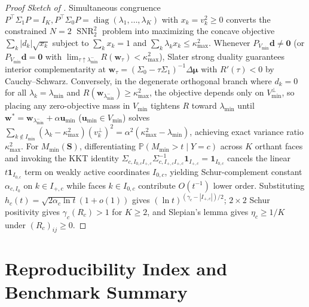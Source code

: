 \documentclass{article}
\theoremstyle{plain}
\theoremstyle{definition}
\theoremstyle{remark}
\newcommand{\Prob}{\mathbb{P}}
\newcommand{\SNR}{\operatorname{SNR}}
\begin{document}
\begin{proof}[Proof Sketch of ]
Simultaneous congruence $P^\top\Sigma_1 P = I_K, P^\top\Sigma_0 P = \operatorname{diag}(\lambda_1,\dots,\lambda_K)$ with $x_k = v_k^2 \ge 0$ converts the constrained $N=2$ $\SNR_2^2$ problem into maximizing the concave objective $\sum_k |d_k|\sqrt{x_k}$ subject to $\sum_k x_k = 1$ and $\sum_k \lambda_k x_k \le \kappa_{\max}^2$. Whenever $P_{V_{\min}}\mathbf{d} \neq \mathbf{0}$ (or $P_{V_{\min}}\mathbf{d} = \mathbf{0}$ with $\lim_{\tau \uparrow \lambda_{\min}^-} R(\mathbf{w}_\tau) < \kappa_{\max}^2$), Slater strong duality guarantees interior complementarity at $\mathbf{w}_\tau = (\Sigma_0 - \tau\Sigma_1)^{-1}\Delta\boldsymbol{\mu}$ with $R'(\tau) < 0$ by Cauchy--Schwarz. Conversely, in the degenerate orthogonal branch where $d_k = 0$ for all $\lambda_k = \lambda_{\min}$ and $R(\mathbf{w}_{\lambda_{\min}^-}) \ge \kappa_{\max}^2$, the objective depends only on $V_{\min}^\perp$, so placing any zero-objective mass in $V_{\min}$ tightens $R$ toward $\lambda_{\min}$ until $\mathbf{w}^* = \mathbf{w}_{\lambda_{\min}^-} + \alpha\mathbf{u}_{\min}$ ($\mathbf{u}_{\min} \in V_{\min}$) solves $\sum_{k \notin I_{\min}}(\lambda_k - \kappa_{\max}^2)(v_k^{\perp})^2 = \alpha^2(\kappa_{\max}^2 - \lambda_{\min})$, achieving exact variance ratio $\kappa_{\max}^2$. For $M_{\min}(\mathbf{S})$, differentiating $\Prob(M_{\min} > t \mid Y=c)$ across $K$ orthant faces and invoking the KKT identity $\Sigma_{c, I_{0,c}I_{+,c}}\Sigma_{c, I_{+,c}I_{+,c}}^{-1}\mathbf{1}_{I_{+,c}} = \mathbf{1}_{I_{0,c}}$ cancels the linear $t\mathbf{1}_{I_{0,c}}$ term on weakly active coordinates $I_{0,c}$, yielding Schur-complement constant $\alpha_{c, I_0}$ on $k \in I_{+,c}$ while faces $k \in I_{0,c}$ contribute $O(t^{-1})$ lower order. Substituting $h_c(t) = \sqrt{2\alpha_c\ln t}(1+o(1))$ gives $(\ln t)^{(\gamma_c - |I_{+,c}|)/2}$; $2\times 2$ Schur positivity gives $\gamma_c(R_c) > 1$ for $K \ge 2$, and Slepian's lemma gives $\eta_c \ge 1/K$ under $(R_c)_{ij} \ge 0$.
\end{proof}

\section{Reproducibility Index and Benchmark Summary}
\label{app:index}
\end{document}
